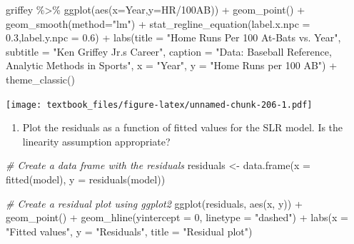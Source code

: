 \documentclass[
  11pt,
]{book}
\newenvironment{Shaded}{\begin{snugshade}}{\end{snugshade}}
\newcommand{\AttributeTok}[1]{\textcolor[rgb]{0.77,0.63,0.00}{#1}}
\newcommand{\CommentTok}[1]{\textcolor[rgb]{0.56,0.35,0.01}{\textit{#1}}}
\newcommand{\DecValTok}[1]{\textcolor[rgb]{0.00,0.00,0.81}{#1}}
\newcommand{\FloatTok}[1]{\textcolor[rgb]{0.00,0.00,0.81}{#1}}
\newcommand{\FunctionTok}[1]{\textcolor[rgb]{0.00,0.00,0.00}{#1}}
\newcommand{\NormalTok}[1]{#1}
\newcommand{\OtherTok}[1]{\textcolor[rgb]{0.56,0.35,0.01}{#1}}
\newcommand{\SpecialCharTok}[1]{\textcolor[rgb]{0.00,0.00,0.00}{#1}}
\newcommand{\StringTok}[1]{\textcolor[rgb]{0.31,0.60,0.02}{#1}}
\providecommand{\tightlist}{%
  \setlength{\itemsep}{0pt}\setlength{\parskip}{0pt}}
\theoremstyle{definition}
\theoremstyle{definition}
\theoremstyle{definition}
\theoremstyle{definition}
\theoremstyle{remark}
\begin{document}
\begin{Shaded}
\begin{Highlighting}[]
\NormalTok{griffey }\SpecialCharTok{\%\textgreater{}\%} \FunctionTok{ggplot}\NormalTok{(}\FunctionTok{aes}\NormalTok{(}\AttributeTok{x=}\NormalTok{Year,}\AttributeTok{y=}\StringTok{\textasciigrave{}}\AttributeTok{HR/100AB}\StringTok{\textasciigrave{}}\NormalTok{)) }\SpecialCharTok{+}
  \FunctionTok{geom\_point}\NormalTok{() }\SpecialCharTok{+}
  \FunctionTok{geom\_smooth}\NormalTok{(}\AttributeTok{method=}\StringTok{"lm"}\NormalTok{) }\SpecialCharTok{+} 
  \FunctionTok{stat\_regline\_equation}\NormalTok{(}\AttributeTok{label.x.npc =} \FloatTok{0.3}\NormalTok{,}\AttributeTok{label.y.npc =} \FloatTok{0.6}\NormalTok{) }\SpecialCharTok{+}
  \FunctionTok{labs}\NormalTok{(}\AttributeTok{title =} \StringTok{"Home Runs Per 100 At{-}Bats vs. Year"}\NormalTok{,}
       \AttributeTok{subtitle =} \StringTok{"Ken Griffey Jr.\textquotesingle{}s Career"}\NormalTok{,}
       \AttributeTok{caption =} \StringTok{"Data: Baseball Reference, Analytic Methods in Sports"}\NormalTok{, }
       \AttributeTok{x =} \StringTok{"Year"}\NormalTok{,}
       \AttributeTok{y =} \StringTok{"Home Runs per 100 AB"}\NormalTok{) }\SpecialCharTok{+}
  \FunctionTok{theme\_classic}\NormalTok{()}
\end{Highlighting}
\end{Shaded}

\texttt{[image: textbook\_files/figure-latex/unnamed-chunk-206-1.pdf]}

\newpage

\begin{enumerate}
\def\labelenumi{(\alph{enumi})}
\setcounter{enumi}{3}
\tightlist
\item
  Plot the residuals as a function of fitted values for the SLR model. Is the linearity assumption appropriate?
\end{enumerate}

\begin{Shaded}
\begin{Highlighting}[]
\CommentTok{\# Create a data frame with the residuals}
\NormalTok{residuals }\OtherTok{\textless{}{-}} \FunctionTok{data.frame}\NormalTok{(}\AttributeTok{x =} \FunctionTok{fitted}\NormalTok{(model), }\AttributeTok{y =} \FunctionTok{residuals}\NormalTok{(model))}

\CommentTok{\# Create a residual plot using ggplot2}
\FunctionTok{ggplot}\NormalTok{(residuals, }\FunctionTok{aes}\NormalTok{(x, y)) }\SpecialCharTok{+}
  \FunctionTok{geom\_point}\NormalTok{() }\SpecialCharTok{+}
  \FunctionTok{geom\_hline}\NormalTok{(}\AttributeTok{yintercept =} \DecValTok{0}\NormalTok{, }\AttributeTok{linetype =} \StringTok{"dashed"}\NormalTok{) }\SpecialCharTok{+}
  \FunctionTok{labs}\NormalTok{(}\AttributeTok{x =} \StringTok{"Fitted values"}\NormalTok{, }\AttributeTok{y =} \StringTok{"Residuals"}\NormalTok{, }\AttributeTok{title =} \StringTok{"Residual plot"}\NormalTok{)}
\end{Highlighting}
\end{Shaded}
\end{document}
